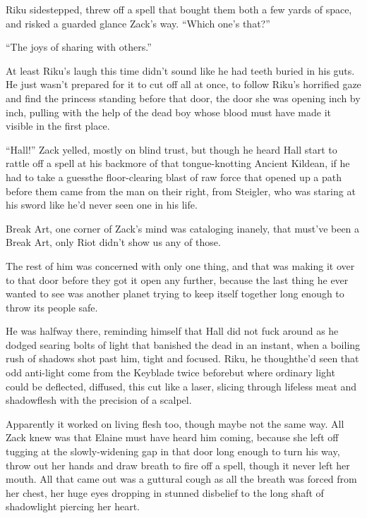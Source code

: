Riku sidestepped, threw off a spell that bought them both a few yards of space, and risked a guarded glance Zack's way. ``Which one's that?''

``The joys of sharing with others.''

At least Riku's laugh this time didn't sound like he had teeth buried in his guts. He just wasn't prepared for it to cut off all at once, to follow Riku's horrified gaze and find the princess standing before that door, the door she was opening inch by inch, pulling with the help of the dead boy whose blood must have made it visible in the first place.

``Hall!'' Zack yelled, mostly on blind trust, but though he heard Hall start to rattle off a spell at his back\textemdash more of that tongue-knotting Ancient Kildean, if he had to take a guess\textemdash the floor-clearing blast of raw force that opened up a path before them came from the man on their right, from Steigler, who was staring at his sword like he'd never seen one in his life.

Break Art, one corner of Zack's mind was cataloging inanely, that must've been a Break Art, only Riot didn't show us any of those.

The rest of him was concerned with only one thing, and that was making it over to that door before they got it open any further, because the last thing he ever wanted to see was another planet trying to keep itself together long enough to throw its people safe.

He was halfway there, reminding himself that Hall did not fuck around as he dodged searing bolts of light that banished the dead in an instant, when a boiling rush of shadows shot past him, tight and focused. Riku, he thought\textemdash he'd seen that odd anti-light come from the Keyblade twice before\textemdash but where ordinary light could be deflected, diffused, this cut like a laser, slicing through lifeless meat and shadowflesh with the precision of a scalpel.

Apparently it worked on living flesh too, though maybe not the same way. All Zack knew was that Elaine must have heard him coming, because she left off tugging at the slowly-widening gap in that door long enough to turn his way, throw out her hands and draw breath to fire off a spell, though it never left her mouth. All that came out was a guttural cough as all the breath was forced from her chest, her huge eyes dropping in stunned disbelief to the long shaft of shadowlight piercing her heart.

